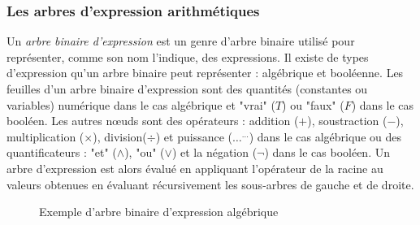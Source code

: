 \documentclass{report}
\begin{document}
\subsubsection{Les arbres d'expression arithmétiques}

Un \textit{arbre binaire d'expression} est un genre d'arbre binaire utilisé pour représenter, comme son nom l'indique, des expressions. Il existe de types d'expression qu'un arbre binaire peut représenter : algébrique et booléenne.
Les feuilles d'un arbre binaire d'expression sont des quantités (constantes ou variables) numérique dans le cas algébrique et "vrai" ($T$) ou "faux" ($F$) dans le cas booléen.
Les autres nœuds sont des opérateurs : addition ($+$), soustraction ($-$), multiplication ($\times$), division($\div$) et puissance ($\ldots^{\ldots}$) dans le cas algébrique ou des quantificateurs : "et" ($\wedge$), "ou" ($\vee$) et la négation ($\neg$) dans le cas booléen.
Un arbre d'expression est alors évalué en appliquant l'opérateur de la racine au valeurs obtenues en évaluant récursivement les sous-arbres de gauche et de droite.
\begin{figure}
\begin{center}
\caption{Exemple d'arbre binaire d'expression algébrique} \label{fig:Exemple d'arbre binaire d'expression algébrique}
\end{center}
\end{figure} 
\end{document}
